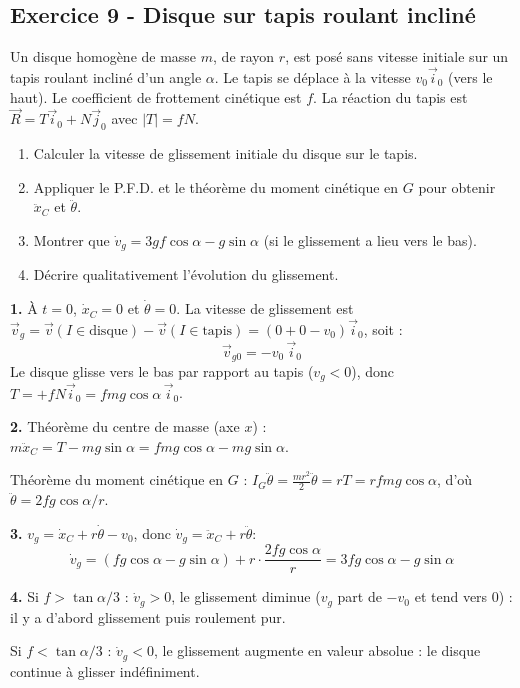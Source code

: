 \documentclass[12pt,a4paper]{article}
\begin{document}
\subsection*{Exercice 9 - Disque sur tapis roulant incliné \niveau{\difficile}}

\begin{boiteexercice}
Un disque homogène de masse $m$, de rayon $r$, est posé sans vitesse initiale sur un tapis roulant incliné d'un angle $\alpha$. Le tapis se déplace à la vitesse $v_0\vec{i}_0$ (vers le haut). Le coefficient de frottement cinétique est $f$. La réaction du tapis est $\vec{R} = T\vec{i}_0 + N\vec{j}_0$ avec $|T| = fN$.
\begin{enumerate}
  \item Calculer la vitesse de glissement initiale du disque sur le tapis.
  \item Appliquer le P.F.D. et le théorème du moment cinétique en $G$ pour obtenir $\ddot{x}_C$ et $\ddot{\theta}$.
  \item Montrer que $\dot{v}_g = 3gf\cos\alpha - g\sin\alpha$ (si le glissement a lieu vers le bas).
  \item Décrire qualitativement l'évolution du glissement.
\end{enumerate}
\end{boiteexercice}

\begin{boitecorrige}
\textbf{1.} À $t=0$, $\dot{x}_C = 0$ et $\dot{\theta} = 0$. La vitesse de glissement est $\vec{v}_g = \vec{v}(I\in\text{disque}) - \vec{v}(I\in\text{tapis}) = (0 + 0 - v_0)\vec{i}_0$, soit :
\[
\vec{v}_{g0} = -v_0\,\vec{i}_0
\]
Le disque glisse vers le bas par rapport au tapis ($v_g < 0$), donc $T = +fN\vec{i}_0 = fmg\cos\alpha\,\vec{i}_0$.

\textbf{2.} Théorème du centre de masse (axe $x$) : $m\ddot{x}_C = T - mg\sin\alpha = fmg\cos\alpha - mg\sin\alpha$.

Théorème du moment cinétique en $G$ : $I_G\ddot{\theta} = \frac{mr^2}{2}\ddot{\theta} = rT = rfmg\cos\alpha$, d'où $\ddot{\theta} = 2fg\cos\alpha/r$.

\textbf{3.} $v_g = \dot{x}_C + r\dot{\theta} - v_0$, donc $\dot{v}_g = \ddot{x}_C + r\ddot{\theta}$:
\[
\dot{v}_g = (fg\cos\alpha - g\sin\alpha) + r\cdot\frac{2fg\cos\alpha}{r} = 3fg\cos\alpha - g\sin\alpha
\]

\textbf{4.} Si $f > \tan\alpha/3$ : $\dot{v}_g > 0$, le glissement diminue ($v_g$ part de $-v_0$ et tend vers $0$) : il y a d'abord glissement puis roulement pur.

Si $f < \tan\alpha/3$ : $\dot{v}_g < 0$, le glissement augmente en valeur absolue : le disque continue à glisser indéfiniment.
\end{boitecorrige}
\end{document}
